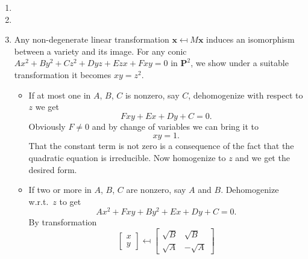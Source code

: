 \documentclass{note}
\newcommand{\Proj}[1]{\mathbf{P}^{#1}}
\begin{document}
\Ex
\begin{enumerate}
  \item
  \item
  \item Any non-degenerate linear transformation
        $\mathbf{x} \mapsfrom M\mathbf{x}$ induces an isomorphism between a
        variety and its image. For any conic $Ax^2 + By^2 + Cz^2 + Dyz + Ezx + Fxy = 0$
        in $\Proj{2}$, we show under a suitable transformation it becomes $xy = z^2$.
        \begin{itemize}
          \item If at most one in $A$, $B$, $C$ is nonzero, say $C$,
                dehomogenize with respect to $z$ we get
                \begin{equation*}
                  Fxy + Ex + Dy + C = 0.
                \end{equation*}
                Obviously $F \ne 0$ and by change of variables we can bring it to
                \begin{equation*}
                  xy = 1.
                \end{equation*}
                That the constant term is not zero is a consequence of the fact that the
                quadratic equation is irreducible. Now homogenize to $z$ and we get the desired
                form.
          \item If two or more in $A$, $B$, $C$ are nonzero, say $A$ and $B$.
                Dehomogenize w.r.t.~$z$ to get
                \begin{equation*}
                  Ax^2 + Fxy + By^2 + Ex + Dy + C = 0.
                \end{equation*}
                By transformation
                \begin{equation*}
                  \begin{bmatrix}
                    x \\ y
                  \end{bmatrix}
                  \mapsfrom
                  \begin{bmatrix}
                    \sqrt{B} & \sqrt{B}  \\
                    \sqrt{A} & -\sqrt{A}


\end{bmatrix}
\end{equation*}
\end{itemize}
\end{enumerate}
\end{document}

